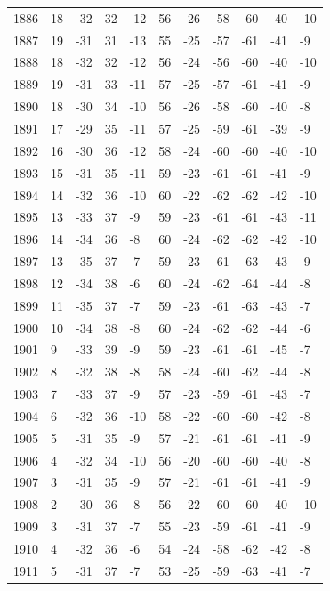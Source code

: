 \begin{table}[H]
\begin{tabular}{lllllllllll}
1886 & 18 & -32 & 32 & -12 & 56 & -26 & -58 & -60 & -40 & -10 \\
1887 & 19 & -31 & 31 & -13 & 55 & -25 & -57 & -61 & -41 & -9 \\
1888 & 18 & -32 & 32 & -12 & 56 & -24 & -56 & -60 & -40 & -10 \\
1889 & 19 & -31 & 33 & -11 & 57 & -25 & -57 & -61 & -41 & -9 \\
1890 & 18 & -30 & 34 & -10 & 56 & -26 & -58 & -60 & -40 & -8 \\
1891 & 17 & -29 & 35 & -11 & 57 & -25 & -59 & -61 & -39 & -9 \\
1892 & 16 & -30 & 36 & -12 & 58 & -24 & -60 & -60 & -40 & -10 \\
1893 & 15 & -31 & 35 & -11 & 59 & -23 & -61 & -61 & -41 & -9 \\
1894 & 14 & -32 & 36 & -10 & 60 & -22 & -62 & -62 & -42 & -10 \\
1895 & 13 & -33 & 37 & -9 & 59 & -23 & -61 & -61 & -43 & -11 \\
1896 & 14 & -34 & 36 & -8 & 60 & -24 & -62 & -62 & -42 & -10 \\
1897 & 13 & -35 & 37 & -7 & 59 & -23 & -61 & -63 & -43 & -9 \\
1898 & 12 & -34 & 38 & -6 & 60 & -24 & -62 & -64 & -44 & -8 \\
1899 & 11 & -35 & 37 & -7 & 59 & -23 & -61 & -63 & -43 & -7 \\
1900 & 10 & -34 & 38 & -8 & 60 & -24 & -62 & -62 & -44 & -6 \\
1901 & 9 & -33 & 39 & -9 & 59 & -23 & -61 & -61 & -45 & -7 \\
1902 & 8 & -32 & 38 & -8 & 58 & -24 & -60 & -62 & -44 & -8 \\
1903 & 7 & -33 & 37 & -9 & 57 & -23 & -59 & -61 & -43 & -7 \\
1904 & 6 & -32 & 36 & -10 & 58 & -22 & -60 & -60 & -42 & -8 \\
1905 & 5 & -31 & 35 & -9 & 57 & -21 & -61 & -61 & -41 & -9 \\
1906 & 4 & -32 & 34 & -10 & 56 & -20 & -60 & -60 & -40 & -8 \\
1907 & 3 & -31 & 35 & -9 & 57 & -21 & -61 & -61 & -41 & -9 \\
1908 & 2 & -30 & 36 & -8 & 56 & -22 & -60 & -60 & -40 & -10 \\
1909 & 3 & -31 & 37 & -7 & 55 & -23 & -59 & -61 & -41 & -9 \\
1910 & 4 & -32 & 36 & -6 & 54 & -24 & -58 & -62 & -42 & -8 \\
1911 & 5 & -31 & 37 & -7 & 53 & -25 & -59 & -63 & -41 & -7 \\

\end{tabular}
\end{table}

